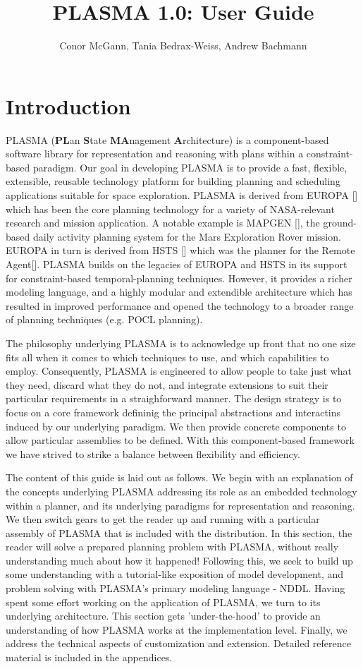 \documentclass[10pt, letterpaper, twoside]{article}
\author{Conor McGann, Tania Bedrax-Weiss, Andrew Bachmann}
\title{PLASMA 1.0: User Guide}
\begin{document}
\maketitle

\section{Introduction}
PLASMA ({\bf PL}an {\bf S}tate {\bf MA}nagement {\bf A}rchitecture) is a component-based software library for representation and reasoning with plans within a constraint-based paradigm. Our goal in developing PLASMA is to provide a fast, flexible, extensible, reusable technology platform for building planning and scheduling applications suitable for space exploration. PLASMA is derived from EUROPA [] which has been the core planning technology for a variety of NASA-relevant research and mission application. A notable example is  MAPGEN [], the ground-based daily activity planning system for the Mars Exploration Rover mission. EUROPA in turn is derived from HSTS [] which was the planner for the Remote Agent[]. PLASMA builds on the legacies of EUROPA and HSTS in its support for constraint-based temporal-planning techniques. However, it provides a richer modeling language, and a highly modular and extendible architecture which has resulted in improved performance and opened the technology to a broader range of planning techniques (e.g. POCL planning). 

The philosophy underlying PLASMA is to acknowledge up front that no one size fits all when it comes to which techniques to use, and which capabilities to employ. Consequently, PLASMA is engineered to allow people to take just what they need, discard what they do not, and integrate extensions to suit their particular requirements in a straighforward manner. The design strategy is to focus on a core framework defininig the principal abstractions and interactins induced by our underlying paradigm. We then provide concrete components to allow particular assemblies to be defined. With this component-based framework we have strived to strike a balance between flexibility and efficiency.

The content of this guide is laid out as follows. We begin with an explanation of the concepts underlying PLASMA addressing its role as an embedded technology within a planner, and its underlying paradigms for representation and reasoning. We then switch gears to get the reader up and running with a particular assembly of PLASMA that is included with the distribution. In this section, the reader will solve a prepared planning problem with PLASMA, without really understanding much about how it happened! Following this, we seek to build up some understanding with a tutorial-like exposition of model development, and problem solving with PLASMA's primary modeling language - NDDL. Having spent some effort working on the application of PLASMA, we turn to its underlying architecture. This section gets 'under-the-hood' to provide an understanding of how PLASMA works at the implementation level.  Finally, we address the technical aspects of customization and extension. Detailed reference material is included in the appendices.
\end{document}
